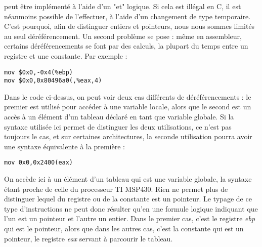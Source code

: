 \documentclass[a4paper,12pt]{article}
\begin{document}
peut être implémenté à l'aide d'un "et" logique. Si cela est illégal en C,
il est néanmoins possible de l'effectuer, à l'aide d'un changement de type
temporaire. C'est pourquoi, afin de distinguer entiers et pointeurs, nous
nous sommes limités au seul déréférencement. Un second problème se pose :
même en assembleur, certains déréférencements se font par des calculs,
la plupart du temps entre un registre et une constante. Par exemple :
\begin{lstlisting}[style=customasm]
mov $0x0,-0x4(%ebp)
mov $0x0,0x80496a0(,%eax,4)
\end{lstlisting}
Dans le code ci-dessus, on peut voir deux cas différents de 
déréférencements : le premier est utilisé pour accéder à une variable
locale, alors que le second est un accès à un élément d'un tableau 
déclaré en tant que variable globale. Si la syntaxe utilisée ici
permet de distinguer les deux utilisations, ce n'est pas toujours le cas,
et sur certaines architectures, la seconde utilisation pourra avoir une
syntaxe équivalente à la première :
\begin{lstlisting}[style=customasm]
mov 0x0,0x2400(eax)
\end{lstlisting}
On accède ici à un élément d'un tableau qui est une variable globale, la
syntaxe étant proche de celle du processeur TI MSP430. Rien ne permet plus
de distinguer lequel du registre ou de la constante est un pointeur. Le
typage de ce type d'instructions ne peut donc résulter qu'en une formule
logique indiquant que l'un est un pointeur et l'autre un entier. Dans le
premier cas, c'est le registre \textit{ebp} qui est le pointeur, alors que
dans les autres cas, c'est la constante qui est un pointeur, le registre
\textit{eax} servant à parcourir le tableau.
\end{document}
